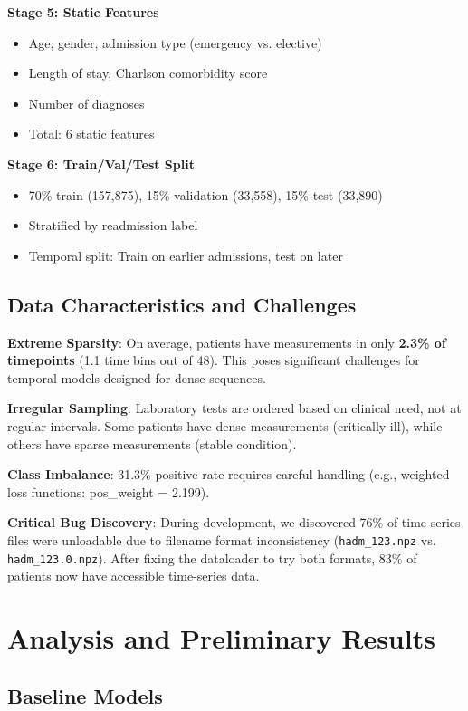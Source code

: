 \documentclass[conference]{IEEEtran}
\begin{document}
\textbf{Stage 5: Static Features}
\begin{itemize}
    \item Age, gender, admission type (emergency vs. elective)
    \item Length of stay, Charlson comorbidity score
    \item Number of diagnoses
    \item Total: 6 static features
\end{itemize}

\textbf{Stage 6: Train/Val/Test Split}
\begin{itemize}
    \item 70\% train (157,875), 15\% validation (33,558), 15\% test (33,890)
    \item Stratified by readmission label
    \item Temporal split: Train on earlier admissions, test on later
\end{itemize}

\subsection{Data Characteristics and Challenges}

\textbf{Extreme Sparsity}: On average, patients have measurements in only \textbf{2.3\% of timepoints} (1.1 time bins out of 48). This poses significant challenges for temporal models designed for dense sequences.

\textbf{Irregular Sampling}: Laboratory tests are ordered based on clinical need, not at regular intervals. Some patients have dense measurements (critically ill), while others have sparse measurements (stable condition).

\textbf{Class Imbalance}: 31.3\% positive rate requires careful handling (e.g., weighted loss functions: pos\_weight = 2.199).

\textbf{Critical Bug Discovery}: During development, we discovered 76\% of time-series files were unloadable due to filename format inconsistency (\texttt{hadm\_123.npz} vs. \texttt{hadm\_123.0.npz}). After fixing the dataloader to try both formats, 83\% of patients now have accessible time-series data.

\section{Analysis and Preliminary Results}

\subsection{Baseline Models}
\end{document}

